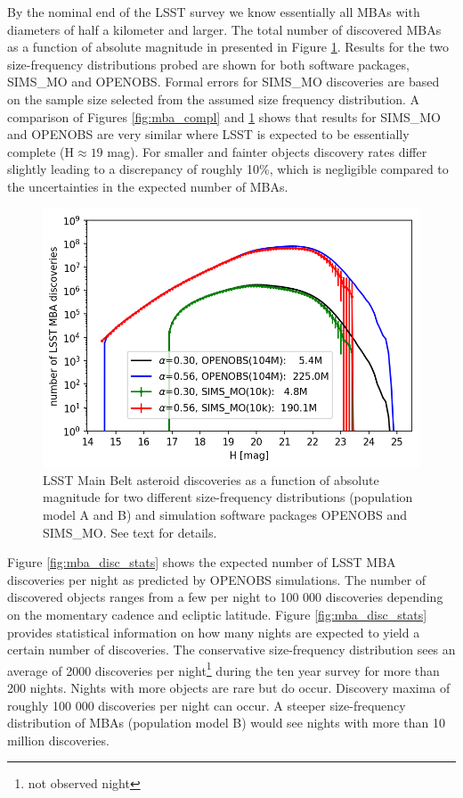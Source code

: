 By the nominal end of the LSST survey we know essentially all MBAs with diameters of half a kilometer and larger.
The total number of discovered MBAs as a function of absolute magnitude in presented in Figure \ref{fig:mba_disc}. Results for the two  size-frequency distributions probed are 
shown for both software packages, SIMS\_MO and OPENOBS. Formal errors for SIMS\_MO discoveries are based on the sample size selected from the assumed size frequency distribution.  
A comparison of Figures \ref{fig:mba_compl} and \ref{fig:mba_disc} shows that results for SIMS\_MO and OPENOBS are very similar where LSST is expected to be essentially complete (H$\approx19$ mag). For smaller and fainter objects discovery rates differ slightly leading to a discrepancy of roughly 10\%, which is negligible compared to the uncertainties in the expected number of MBAs. 
%
\begin{figure}[tb!]
\begin{center}
\includegraphics[scale=0.9]{figs/mba_disc3.png}
\end{center}
\caption{LSST Main Belt asteroid discoveries as a function of absolute magnitude for two different size-frequency distributions (population model A and B) and simulation software packages OPENOBS and SIMS\_MO. See text for details.}
\label{fig:mba_disc}       %
\end{figure}
%
Figure \ref{fig:mba_disc_stats} shows the expected number of LSST MBA discoveries per night as predicted by OPENOBS simulations. The number of discovered objects ranges from a few per night to 100 000 discoveries depending on the momentary cadence and ecliptic latitude. Figure \ref{fig:mba_disc_stats} provides statistical information on how many nights are expected to yield a certain number of discoveries. The conservative size-frequency distribution sees an average of 2000 discoveries per night\footnote{not observed night} during the ten year survey for more than 200 nights. Nights with more objects are rare but do occur. Discovery maxima of roughly 100 000 discoveries per night can occur. A steeper size-frequency distribution of MBAs (population model B) would see nights with more than 10 million discoveries. 

